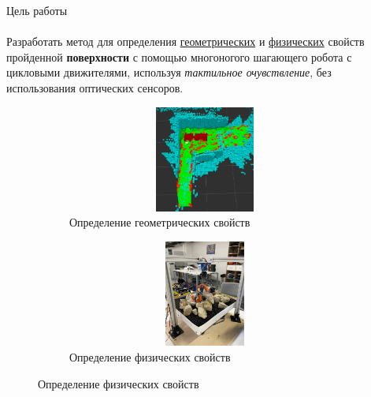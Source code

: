 \documentclass[aspectratio=169,xcolor=table,10pt]{beamer}
\begin{document}
\begin{frame}[t]{Цель работы}
    \framesubtitle{}
    \vspace{-0.4cm}
    Разработать метод для определения \underline{геометрических} и \underline{физических} свойств пройденной \textbf{поверхности} с помощью многоногого шагающего робота с цикловыми движителями, используя \textit{тактильное очувствление}, без использования оптических сенсоров.
    \begin{figure}[H]
        \begin{subfigure}{0.49\textwidth}
            \centering\includegraphics[height=3.5cm,width=1\textwidth,keepaspectratio]{conv_concave.png}
            \caption*{Определение геометрических свойств}
        \end{subfigure}
        \begin{subfigure}{0.49\textwidth}
            \centering\includegraphics[height=3.5cm,width=1\textwidth,keepaspectratio]{s_shape_leg/view.jpg}
            \caption*{Определение физических свойств}
            \label{fig:s_shape_leg/view.jpg}
        \end{subfigure}
    \end{figure}
\end{frame}
\end{document}
